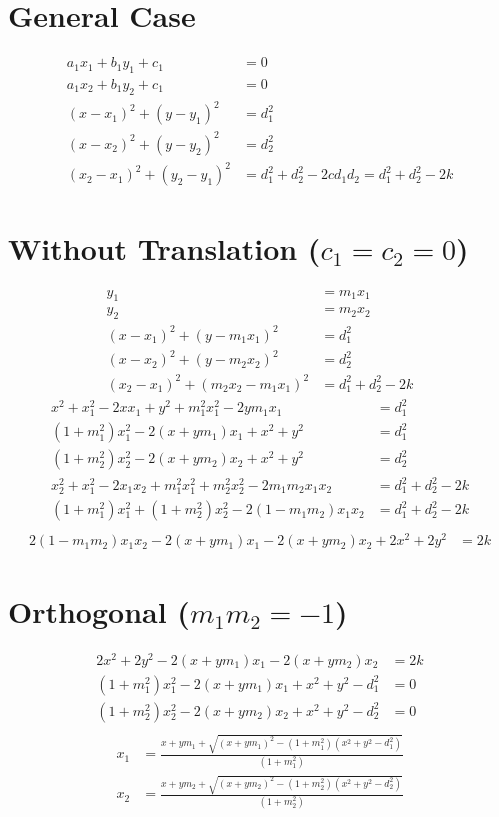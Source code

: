 \documentclass{article}
\begin{document}
\section{General Case}
\begin{align*}
  a_1 x_1 + b_1 y_1 + c_1 & = 0\\
  a_1 x_2 + b_1 y_2 + c_1 & = 0\\
  (x - x_1)^2 + (y - y_1)^2 & = d_1^2\\
  (x - x_2)^2 + (y - y_2)^2 & = d_2^2\\
  (x_2 - x_1)^2 + (y_2 - y_1)^2 & = d_1^2 + d_2^2 - 2 c d_1 d_2 = d_1^2 + d_2^2 - 2 k
\end{align*}
\section{Without Translation ($c_1 = c_2 = 0$)}
\begin{align*}
  y_1 & = m_1 x_1\\
  y_2 & = m_2 x_2\\
  (x - x_1)^2 + (y - m_1 x_1)^2 & = d_1^2\\
  (x - x_2)^2 + (y - m_2 x_2)^2 & = d_2^2\\
  (x_2 - x_1)^2 + (m_2 x_2 - m_1 x_1)^2 & = d_1^2 + d_2^2 - 2 k
\end{align*}
\begin{align*}
  x^2 + x_1^2 - 2 x x_1 + y^2 + m_1^2x_1^2 - 2 y m_1 x_1 &= d_1^2\\
  (1 + m_1^2) x_1^2 - 2 (x + y m_1) x_1  + x^2 + y^2  &= d_1^2\\
  (1 + m_2^2) x_2^2 - 2 (x + y m_2) x_2  + x^2 + y^2  &= d_2^2\\
  x_2^2 + x_1^2 - 2 x_1 x_2 + m_1^2 x_1^2 + m_2^2 x_2^2 - 2 m_1 m_2 x_1 x_2 &= d_1^2 + d_2^2 - 2 k\\
  (1 + m_1^2) x_1^2 + (1 + m_2^2) x_2^2 - 2 (1 - m_1 m_2) x_1 x_2 &= d_1^2 + d_2^2 - 2 k\\
\end{align*}
\begin{align*}
  2 (1 - m_1 m_2) x_1 x_2 - 2 (x + y m_1) x_1 - 2 (x + y m_2) x_2 + 2 x^2 + 2 y^2 &= 2 k
\end{align*}
\section{Orthogonal ($m_1 m_2 = -1$)}
\begin{align*}
  2 x^2 + 2 y^2 - 2 (x + y m_1) x_1 - 2 (x + y m_2) x_2 &= 2 k\\
  (1 + m_1^2) x_1^2 - 2 (x + y m_1) x_1  + x^2 + y^2 - d_1^2 &= 0\\
  (1 + m_2^2) x_2^2 - 2 (x + y m_2) x_2  + x^2 + y^2 - d_2^2 &= 0\\
\end{align*}
\begin{align*}
  x_1 &= \frac{x + y m_1 + \sqrt{(x + y m_1)^2 - (1 + m_1^2)(x^2 + y^2 - d_1^2)}}{(1 + m_1^2)}\\
  x_2 &= \frac{x + y m_2 + \sqrt{(x + y m_2)^2 - (1 + m_2^2)(x^2 + y^2 - d_2^2)}}{(1 + m_2^2)}
\end{align*}
\end{document}
